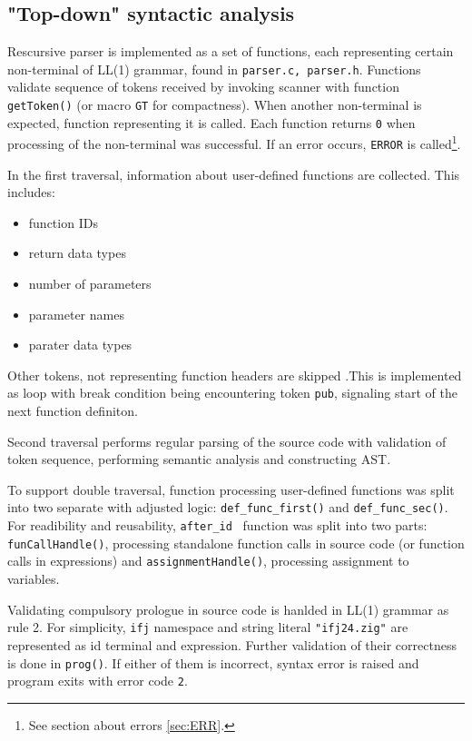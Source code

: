 \documentclass[a4paper, 11pt]{article}
\begin{document}
\subsection{"Top-down" syntactic analysis}\label{sec:PARSER}
Rescursive parser is implemented as a set of functions, each representing certain non-terminal of LL(1) grammar, found in
\verb|parser.c, parser.h|.
Functions validate sequence of tokens received by invoking scanner with function \verb|getToken()| (or macro \verb|GT| for 
compactness). When another non-terminal is expected, function representing it is called.
Each function returns \verb|0| when processing of the non-terminal was successful. If an error occurs, \verb|ERROR| is called\footnote{See section
about errors \ref{sec:ERR}.}.
\par
In the first traversal, information about user-defined functions are collected. This includes:
\begin{itemize}
\item function IDs
\item return data types
\item number of parameters
\item parameter names 
\item parater data types
\end{itemize}
Other tokens, not representing function headers are skipped 
.This is implemented as loop with break condition being encountering token \verb|pub|, signaling start of the next function definiton.
\par
Second traversal performs regular parsing of the source code with validation of token sequence, performing semantic analysis and constructing
AST.
\par
To support double traversal, function processing user-defined functions was split into two separate with 
adjusted logic: \verb|def_func_first()| and \verb|def_func_sec()|. For readibility and reusability, \verb|after_id|~
function was split into two parts: \verb|funCallHandle()|, processing standalone function calls in source code (or function calls 
in expressions) and \verb|assignmentHandle()|, processing assignment to variables.
\par
Validating compulsory prologue in source code is hanlded in LL(1) grammar as rule 2. For simplicity, 
\verb|ifj| namespace and string literal \verb|"ifj24.zig"| are represented as id terminal and expression.
Further validation of their correctness is done in \verb|prog()|. If either of them is incorrect, syntax error
is raised and program exits with error code \verb|2|.
\end{document}
